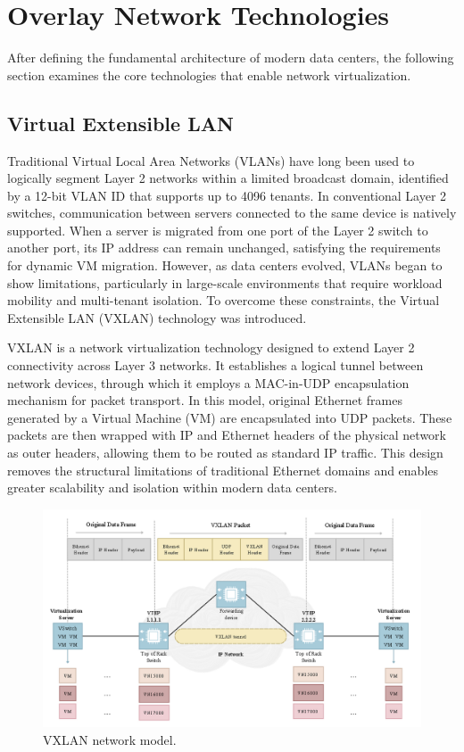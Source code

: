 \section{Overlay Network Technologies}
After defining the fundamental architecture of modern data centers, the following section examines the core technologies that enable network virtualization.

\subsection{Virtual Extensible LAN}
Traditional Virtual Local Area Networks (VLANs) have long been used to logically segment Layer 2 networks within a limited broadcast domain, identified by a 12-bit VLAN ID that supports up to 4096 tenants. In conventional Layer 2 switches, communication between servers connected to the same device is natively supported. When a server is migrated from one port of the Layer 2 switch to another port, its IP address can remain unchanged, satisfying the requirements for dynamic VM migration. However, as data centers evolved, VLANs began to show limitations, particularly in large-scale environments that require workload mobility and multi-tenant isolation. To overcome these constraints, the Virtual Extensible LAN (VXLAN) technology was introduced.

VXLAN is a network virtualization technology designed to extend Layer 2 connectivity across Layer 3 networks. It establishes a logical tunnel between network devices, through which it employs a MAC-in-UDP encapsulation mechanism for packet transport. In this model, original Ethernet frames generated by a Virtual Machine (VM) are encapsulated into UDP packets. These packets are then wrapped with IP and Ethernet headers of the physical network as outer headers, allowing them to be routed as standard IP traffic. This design removes the structural limitations of traditional Ethernet domains and enables greater scalability and isolation within modern data centers.
\newpage
\begin{figure} [H]
    \centering
    \includegraphics[width=0.9\linewidth]{Figures/VXLANmodel.png}
    \caption{VXLAN network model. \cite{ipwithease_vxlan}}
    \label{VXLANmodel}
\end{figure}

